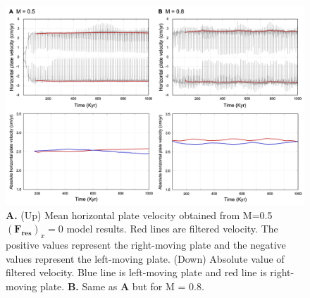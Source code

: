 \documentclass[letterpaper,12pt,notitle]{memphisthesis}                     %
\begin{document}
%
\begin{figure}[!htb]
	\centering
	\includegraphics[width=0.98\linewidth,trim=4 4 4 4,clip]{./figs/f0mhv.png}
	\caption{\textbf{A.} (Up) Mean horizontal plate velocity obtained from M=0.5 $(\boldsymbol{F_{res}})_x=0$ model results. Red lines are filtered velocity. The positive values represent the right-moving plate and the negative values represent the left-moving plate. (Down) Absolute value of filtered velocity. Blue line is left-moving plate and red line is right-moving plate. \textbf{B.} Same as \textbf{A} but for M = 0.8.}
	\label{fig:f0mhv}
\end{figure}
\end{document}
